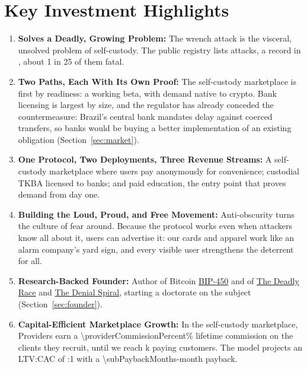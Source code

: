 
\section{Key Investment Highlights}

\begin{enumerate}
    \item \textbf{Solves a Deadly, Growing Problem:} The wrench attack is the visceral, unsolved problem of self-custody. The public registry lists \attacksTotal{} attacks, a record \attacksRecordYearCount{} in \attacksRecordYear, about 1 in 25 of them fatal\cite{lopp2024}.

    \item \textbf{Two Paths, Each With Its Own Proof:} The self-custody marketplace is first by readiness: a working beta, with demand native to crypto. Bank licensing is largest by size, and the regulator has already conceded the countermeasure: Brazil's central bank mandates delay against coerced transfers\cite{bcb2021res142}, so banks would be buying a better implementation of an existing obligation (Section~\ref{sec:market}).

    \item \textbf{One Protocol, Two Deployments, Three Revenue Streams:} A self-custody marketplace where users pay anonymously for convenience; custodial TKBA licensed to banks; and paid education, the entry point that proves demand from day one.

    \item \textbf{Building the Loud, Proud, and Free Movement:} Anti-obscurity turns the culture of fear around. Because the protocol works even when attackers know all about it, users can advertise it: our cards and apparel work like an alarm company's yard sign, and every visible user strengthens the deterrent for all.

    \item \textbf{Research-Backed Founder:} Author of Bitcoin \href{\bipurl}{BIP-450} and of \href{\drurl}{The Deadly Race} and \href{\dsurl}{The Denial Spiral}, starting a doctorate on the subject (Section~\ref{sec:founder}).

    \item \textbf{Capital-Efficient Marketplace Growth:} In the self-custody marketplace, Providers earn a \num{\providerCommissionPercent}\% lifetime commission on the clients they recruit, until we reach k paying customers. The model projects an LTV:CAC of \numint{\ltvCacRatio}:1 with a \num{\subPaybackMonths}-month payback.


\end{enumerate}
